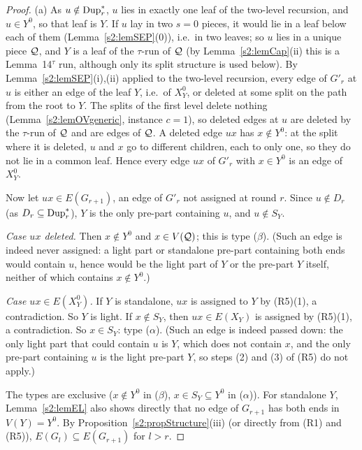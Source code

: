 \begin{proof}
(a) As $u\notin\mathrm{Dup}^{*}_r$, $u$ lies in exactly one leaf of the two-level
recursion, and $u\in Y^0$, so that leaf is $Y$. If $u$ lay in two $s=0$ pieces,
it would lie in a leaf below each of them (Lemma~\ref{s2:lemSEP}(0)), i.e.\ in
two leaves; so $u$ lies in a unique piece $\mathcal{Q}$, and $Y$ is a leaf of the
$\tau$-run of $\mathcal{Q}$ (by Lemma~\ref{s2:lemCap}(ii) this is a
Lemma~14$^\tau$ run, although only its split structure is used below). By
Lemma~\ref{s2:lemSEP}(i),(ii) applied to the two-level recursion, every edge of
$G'_r$ at $u$ is either an edge of the leaf $Y$, i.e.\ of $X^0_Y$, or deleted
at some split on the path from the root to $Y$. The splits of the first level
delete nothing (Lemma~\ref{s2:lemOVgeneric}, instance $c=1$), so deleted edges
at $u$ are deleted by the $\tau$-run of $\mathcal{Q}$ and are edges of $\mathcal{Q}$. A
deleted edge $ux$ has $x\notin Y^0$: at the split where it is deleted, $u$ and
$x$ go to different children, each to only one, so they do not lie in a common
leaf. Hence every edge $ux$ of $G'_r$ with $x\in Y^0$ is an edge of $X^0_Y$.

Now let $ux\in E(G_{r+1})$, an edge of $G'_r$ not assigned at round $r$. Since
$u\notin D_r$ (as $D_r\subseteq\mathrm{Dup}^{*}_r$), $Y$ is the only pre-part containing
$u$, and $u\notin S_Y$.

\emph{Case $ux$ deleted.} Then $x\notin Y^0$ and $x\in V(\mathcal{Q})$; this is type
($\beta$). (Such an edge is indeed never assigned: a light part or standalone
pre-part containing both ends would contain $u$, hence would be the light part
of $Y$ or the pre-part $Y$ itself, neither of which contains $x\notin Y^0$.)

\emph{Case $ux\in E(X^0_Y)$.} If $Y$ is standalone, $ux$ is assigned to $Y$ by
(R5)(1), a contradiction. So $Y$ is light. If $x\notin S_Y$, then $ux\in
E(X_Y)$ is assigned by (R5)(1), a contradiction. So $x\in S_Y$: type
($\alpha$). (Such an edge is indeed passed down: the only light part that could
contain $u$ is $Y$, which does not contain $x$, and the only pre-part
containing $u$ is the light pre-part $Y$, so steps (2) and (3) of (R5) do not
apply.)

The types are exclusive ($x\notin Y^0$ in ($\beta$), $x\in S_Y\subseteq Y^0$ in
($\alpha$)). For standalone $Y$, Lemma~\ref{s2:lemEL} also shows directly that
no edge of $G_{r+1}$ has both ends in $V(Y)=Y^0$. By
Proposition~\ref{s2:propStructure}(iii) (or directly from (R1) and (R5)),
$E(G_l)\subseteq E(G_{r+1})$ for $l>r$.


\end{proof}
